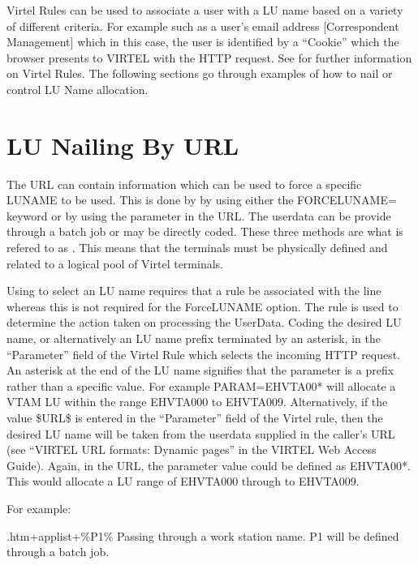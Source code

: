 \documentclass[letterpaper,10pt,english]{sphinxmanual}
\begin{document}
\sphinxAtStartPar
Virtel Rules can be used to associate a user with a LU name based on a variety of different criteria. For example such as a user’s e\sphinxhyphen{}mail address {[}Correspondent Management{]} which in this case, the user is identified by a “Cookie” which the browser presents to VIRTEL with the HTTP request. See {\hyperref[\detokenize{connectivity_guide:v461cn-virtelrules}]{}} for further information on Virtel Rules. The following sections go through examples of how to nail or control LU Name allocation.


\section{LU Nailing By URL}
\label{\detokenize{connectivity_guide:lu-nailing-by-url}}
\sphinxAtStartPar
The URL can contain information which can be used to force a specific LUNAME to be used. This is done by by using either the FORCELUNAME= keyword or by using the  parameter in the URL. The userdata can be provide through a batch job or may be directly coded. These three methods are what is refered to as . This means that the terminals must be physically defined and related to a logical pool of Virtel terminals.

\sphinxAtStartPar
Using  to select an LU name requires that a rule be associated with the line whereas this is not required for the ForceLUNAME option. The rule is used to determine the action taken on processing the UserData. Coding the desired LU name, or alternatively an LU name prefix terminated by an asterisk, in the “Parameter” field of the Virtel Rule which selects the incoming HTTP request. An asterisk at the end of the LU name signifies that the parameter is a prefix rather than a specific value. For example PARAM=EHVTA00* will allocate a VTAM LU within the range EHVTA000 to EHVTA009. Alternatively, if the value \$URL\$ is entered in the “Parameter” field of the Virtel rule, then the desired LU name will be taken from the userdata supplied in the caller’s URL (see “VIRTEL URL formats: Dynamic pages” in the VIRTEL Web Access Guide). Again, in the URL, the parameter value could be defined as EHVTA00*. This would allocate a LU range of EHVTA000 through to EHVTA009.

\sphinxAtStartPar
For example:\sphinxhyphen{}

\sphinxAtStartPar
{}.htm+applist+\%P1\%                Passing through a work station name. P1 will be defined through a batch job.
\end{document}
